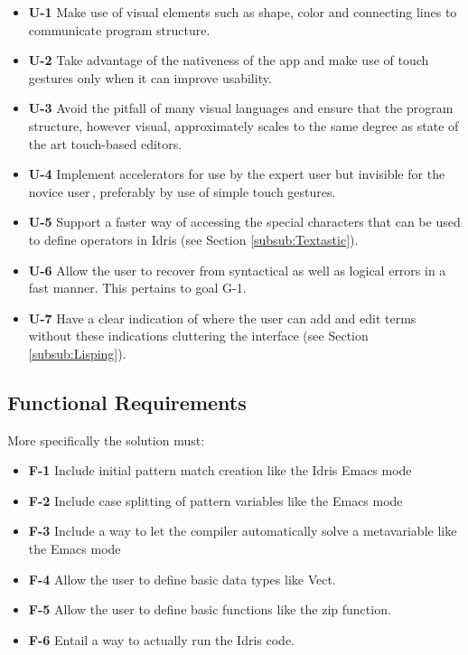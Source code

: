 \begin{itemize}     
	\item \textbf{U-1} Make use of visual elements such as shape, color and connecting lines to 
	communicate program structure.
	\item \textbf{U-2} Take advantage of the nativeness of the app and make use of touch gestures only
	when it can improve usability.
	\item \textbf{U-3} Avoid the pitfall of many visual languages\cite{green1992visual} and ensure 
	that the program structure, however visual, approximately scales to the same degree as state of 
	the art touch-based editors.
	\item \textbf{U-4} Implement accelerators for use by the expert user but invisible for the novice
	user\,\cite{nielsen1990heuristic}, preferably by use of simple touch gestures.
	\item \textbf{U-5} Support a faster way of accessing the special characters that can be used 
	to define operators in Idris (see Section \ref{subsub:Textastic}).
	\item \textbf{U-6} Allow the user to recover from syntactical as well as logical errors in a fast
	manner. This pertains to goal G-1.
	\item \textbf{U-7} Have a clear indication of where the user can add and edit terms without these
	indications cluttering the interface (see Section \ref{subsub:Lisping}).
\end{itemize}


\subsection{Functional Requirements} 
\label{subsec:FunctionalRequirements} 
More specifically the solution must:

\begin{itemize}
	\item \textbf{F-1} Include initial pattern match creation like the Idris Emacs mode \cite{Idris:EmacsMode}
	\item \textbf{F-2} Include case splitting of pattern variables like the Emacs mode \cite{Idris:EmacsMode}
	\item \textbf{F-3} Include a way to let the compiler automatically solve a metavariable like the
	Emacs mode \cite{Idris:EmacsMode}
	\item \textbf{F-4} Allow the user to define basic data types like Vect.
	\item \textbf{F-5} Allow the user to define basic functions like the zip function.
	\item \textbf{F-6} Entail a way to actually run the Idris code. 
\end{itemize}

